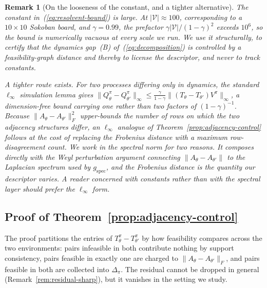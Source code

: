 \documentclass[twoside]{article}
\newcommand{\Tdist}{T}
\newtheorem{remark}[theorem]{Remark}
\begin{document}
\begin{remark}[On the looseness of the constant, and a tighter alternative]
\label{rem:ellinfty}
The constant in~(\ref{eq:resolvent-bound}) is large. At $|\mathcal V| \approx 100$, corresponding to a $10\times10$ Sokoban board, and $\gamma = 0.99$, the prefactor $\gamma|\mathcal V|/(1-\gamma)^2$ exceeds $10^{6}$, so the bound is numerically vacuous at every scale we run. We use it structurally, to certify that the dynamics gap~(B) of~(\ref{eq:decomposition}) is controlled by a feasibility-graph distance and thereby to license the descriptor, and never to track constants.

A tighter route exists. For two processes differing only in dynamics, the standard $\ell_\infty$ simulation lemma \citep{kearns2002near} gives $\|Q^\pi_\theta - Q^\pi_{\theta'}\|_\infty \le \tfrac{\gamma}{1-\gamma}\|(\Tdist_\theta - \Tdist_{\theta'})V^\pi\|_\infty$, a dimension-free bound carrying one rather than two factors of $(1-\gamma)^{-1}$. Because $\|A_\theta - A_{\theta'}\|_F^2$ upper-bounds the number of rows on which the two adjacency structures differ, an $\ell_\infty$ analogue of Theorem~\ref{prop:adjacency-control} follows at the cost of replacing the Frobenius distance with a maximum row-disagreement count. We work in the spectral norm for two reasons. It composes directly with the Weyl perturbation argument connecting $\|A_\theta - A_{\theta'}\|$ to the Laplacian spectrum used by $g_{\mathrm{spec}}$, and the Frobenius distance is the quantity our descriptor varies. A reader concerned with constants rather than with the spectral layer should prefer the $\ell_\infty$ form.
\end{remark}

\subsection{Proof of Theorem~\ref{prop:adjacency-control}}
The proof partitions the entries of $T^\pi_\theta - T^\pi_{\theta'}$ by how feasibility compares across the two environments: pairs infeasible in both contribute nothing by support consistency, pairs feasible in exactly one are charged to $\|A_\theta - A_{\theta'}\|_F$, and pairs feasible in both are collected into $\Delta_\pi$. The residual cannot be dropped in general (Remark~\ref{rem:residual-sharp}), but it vanishes in the setting we study.
\end{document}
